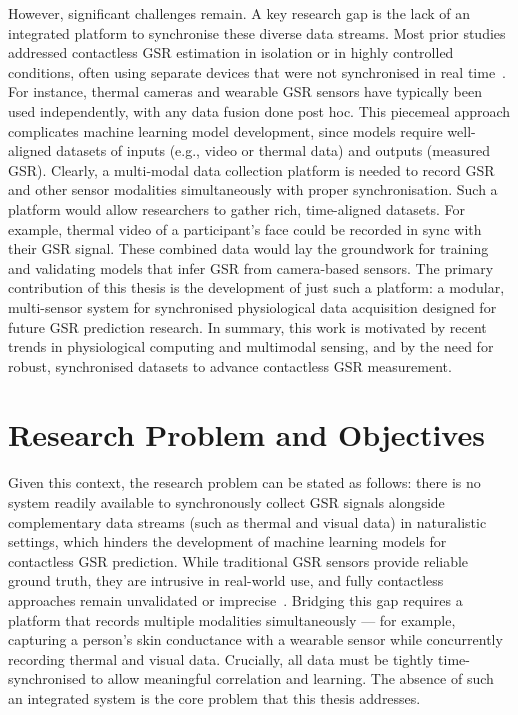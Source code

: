 However, significant challenges remain. A key research gap is the lack of an integrated platform to synchronise these diverse data streams. Most prior studies addressed contactless GSR estimation in isolation or in highly controlled conditions, often using separate devices that were not synchronised in real time~\cite{patel2024electrodermal}. For instance, thermal cameras and wearable GSR sensors have typically been used independently, with any data fusion done post hoc. This piecemeal approach complicates machine learning model development, since models require well-aligned datasets of inputs (e.g., video or thermal data) and outputs (measured GSR). Clearly, a multi-modal data collection platform is needed to record GSR and other sensor modalities simultaneously with proper synchronisation. Such a platform would allow researchers to gather rich, time-aligned datasets. For example, thermal video of a participant's face could be recorded in sync with their GSR signal. These combined data would lay the groundwork for training and validating models that infer GSR from camera-based sensors. The primary contribution of this thesis is the development of just such a platform: a modular, multi-sensor system for synchronised physiological data acquisition designed for future GSR prediction research. In summary, this work is motivated by recent trends in physiological computing and multimodal sensing, and by the need for robust, synchronised datasets to advance contactless GSR measurement.

\section{Research Problem and Objectives}

Given this context, the research problem can be stated as follows: there is no system readily available to synchronously collect GSR signals alongside complementary data streams (such as thermal and visual data) in naturalistic settings, which hinders the development of machine learning models for contactless GSR prediction. While traditional GSR sensors provide reliable ground truth, they are intrusive in real-world use, and fully contactless approaches remain unvalidated or imprecise~\cite{shimmer2025gsr}. Bridging this gap requires a platform that records multiple modalities simultaneously --- for example, capturing a person's skin conductance with a wearable sensor while concurrently recording thermal and visual data. Crucially, all data must be tightly time-synchronised to allow meaningful correlation and learning. The absence of such an integrated system is the core problem that this thesis addresses.

